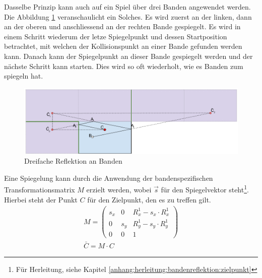 Dasselbe Prinzip kann auch auf ein Spiel über drei Banden angewendet werden. Die Abbildung \ref{fig:Dreifache Reflektion an Banden} veranschaulicht
ein Solches. Es wird zuerst an der linken, dann an der oberen und anschliessend an der rechten Bande gespiegelt.
Es wird in einem Schritt wiederum der letze Spiegelpunkt und dessen Startposition betrachtet, mit welchen der Kollisionspunkt
an einer Bande gefunden werden kann. Danach kann der Spiegelpunkt an dieser Bande gespiegelt werden und der nächste
Schritt kann starten. Dies wird so oft wiederholt, wie es Banden zum spiegeln hat.
\begin{figure}[h!]
    \begin{center}
        \includegraphics[width=1\linewidth]{../common/03_billiard_ai/resources/54_rail_reflection_3.png}
    \end{center}
    \caption{Dreifache Reflektion an Banden}
    \label{fig:Dreifache Reflektion an Banden}
\end{figure}

Eine Spiegelung kann durch die Anwendung der bandenspezifischen Transformationsmatrix $M$ erzielt werden, wobei $\vec{s}$
für den Spiegelvektor steht\footnote{Für Herleitung, siehe Kapitel \ref{anhang:herleitung:bandenreflektion:zielpunkt}}.
Hierbei steht der Punkt $C$ für den Zielpunkt, den es zu treffen gilt.
\begin{align}
    M = \begin{pmatrix}s_x & 0 & R^1_x - s_x \cdot R^1_x \\ 0 & s_y & R^1_y - s_y \cdot R^1_y \\ 0 & 0 & 1\end{pmatrix}\\
    \bar{C} = M \cdot C
\end{align}

